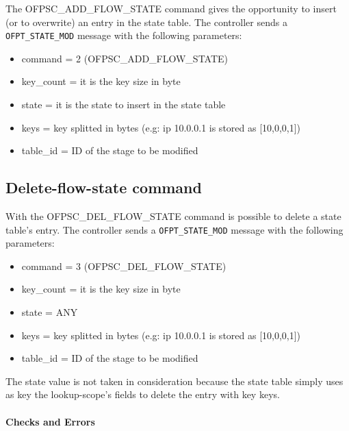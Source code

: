 The OFPSC\_ADD\_FLOW\_STATE command gives the opportunity to insert (or to overwrite) an entry in the state table.
The controller sends a \texttt{OFPT\_STATE\_MOD} message with the following parameters:

\begin{itemize}
\item command = 2 (OFPSC\_ADD\_FLOW\_STATE)
\item key\_count = it is the key size in byte
\item state = it is the state to insert in the state table
\item keys = key splitted in bytes (e.g: ip 10.0.0.1 is stored as [10,0,0,1])
\item table\_id = ID of the stage to be modified
\end{itemize}



\subsection{Delete-flow-state command}
\label{subsec:del_flow}

With the OFPSC\_DEL\_FLOW\_STATE command is possible to delete a state table's entry.
The controller sends a \texttt{OFPT\_STATE\_MOD} message with the following parameters:

\begin{itemize}
\item command = 3 (OFPSC\_DEL\_FLOW\_STATE)
\item key\_count = it is the key size in byte
\item state = ANY
\item keys = key splitted in bytes (e.g: ip 10.0.0.1 is stored as [10,0,0,1])
\item table\_id = ID of the stage to be modified
\end{itemize}


The state value is not taken in consideration because the state table simply uses as key the lookup-scope's fields to delete the entry with key keys.

\paragraph{Checks and Errors}


